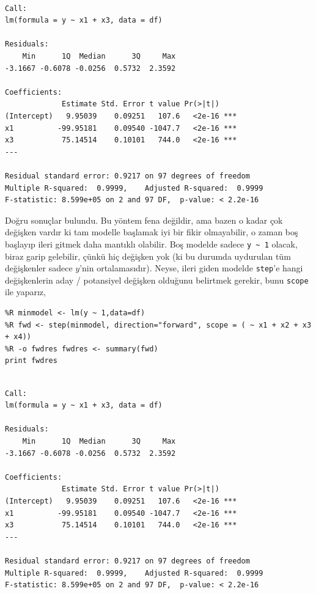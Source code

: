 \documentclass[12pt,fleqn]{article}\usepackage{../../common}
\begin{document}
\begin{verbatim}

Call:
lm(formula = y ~ x1 + x3, data = df)

Residuals:
    Min      1Q  Median      3Q     Max 
-3.1667 -0.6078 -0.0256  0.5732  2.3592 

Coefficients:
             Estimate Std. Error t value Pr(>|t|)    
(Intercept)   9.95039    0.09251   107.6   <2e-16 ***
x1          -99.95181    0.09540 -1047.7   <2e-16 ***
x3           75.14514    0.10101   744.0   <2e-16 ***
---

Residual standard error: 0.9217 on 97 degrees of freedom
Multiple R-squared:  0.9999,	Adjusted R-squared:  0.9999 
F-statistic: 8.599e+05 on 2 and 97 DF,  p-value: < 2.2e-16
\end{verbatim}

Doğru sonuçlar bulundu. Bu yöntem fena değildir, ama bazen o kadar çok değişken
vardır ki tam modelle başlamak iyi bir fikir olmayabilir, o zaman boş başlayıp
ileri gitmek daha mantıklı olabilir. Boş modelde sadece \verb!y ~ 1! olacak,
biraz garip gelebilir, çünkü hiç değişken yok (ki bu durumda uydurulan tüm
değişkenler sadece $y$'nin ortalamasıdır). Neyse, ileri giden modelde
\verb!step!'e hangi değişkenlerin aday / potansiyel değişken olduğunu belirtmek
gerekir, bunu \verb!scope! ile yaparız,

\begin{verbatim}
%R minmodel <- lm(y ~ 1,data=df)
%R fwd <- step(minmodel, direction="forward", scope = ( ~ x1 + x2 + x3 + x4))
%R -o fwdres fwdres <- summary(fwd)
print fwdres
\end{verbatim}

\begin{verbatim}

Call:
lm(formula = y ~ x1 + x3, data = df)

Residuals:
    Min      1Q  Median      3Q     Max 
-3.1667 -0.6078 -0.0256  0.5732  2.3592 

Coefficients:
             Estimate Std. Error t value Pr(>|t|)    
(Intercept)   9.95039    0.09251   107.6   <2e-16 ***
x1          -99.95181    0.09540 -1047.7   <2e-16 ***
x3           75.14514    0.10101   744.0   <2e-16 ***
---

Residual standard error: 0.9217 on 97 degrees of freedom
Multiple R-squared:  0.9999,	Adjusted R-squared:  0.9999 
F-statistic: 8.599e+05 on 2 and 97 DF,  p-value: < 2.2e-16
\end{verbatim}
\end{document}

